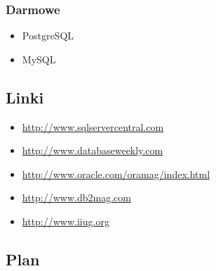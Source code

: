 \documentclass[12pt]{article}
\begin{document}
\subsubsection{Darmowe}
\begin{itemize}
\item PostgreSQL
\item MySQL
\end{itemize}

\subsection{Linki}
\begin{itemize}
\item \url{http://www.sqlservercentral.com}
\item \url{http://www.databaseweekly.com}
\item \url{http://www.oracle.com/oramag/index.html}
\item \url{http://www.db2mag.com}
\item \url{http://www.iiug.org}
\end{itemize}

\subsection{Plan}
\end{document}
